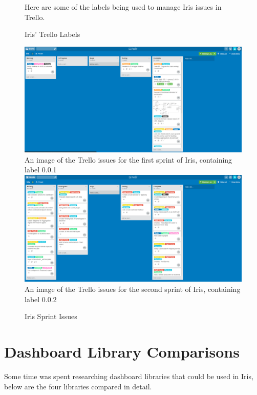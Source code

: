 \documentclass[12pt,a4paper,titlepage]{report}
\begin{document}
\begin{appendices}
\begin{figure}[H]
\begin{tcolorbox}[text width=.8\textwidth]
Here are some of the labels being used to manage Iris issues in Trello.
\end{tcolorbox}
\caption{Iris’ Trello Labels}
\end{figure}

\begin{figure}[H]
\begin{tcolorbox}
\includegraphics[width=\textwidth]{trello_sprint_1}
\newline
An image of the Trello issues for the first sprint of Iris, containing label 0.0.1
\newline
\includegraphics[width=\textwidth]{trello_sprint_2}
\newline
An image of the Trello issues for the second sprint of Iris, containing label 0.0.2
\end{tcolorbox}
\caption{Iris Sprint Issues}
\end{figure}

\chapter{Dashboard Library Comparisons}\label{sec:dashboards}

Some time was spent researching dashboard libraries that could be used in Iris, below are the four libraries compared in detail.


\end{appendices}
\end{document}
